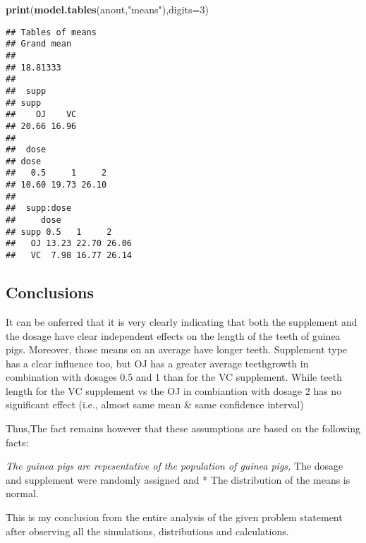 \documentclass[
]{article}
\newenvironment{Shaded}{\begin{snugshade}}{\end{snugshade}}
\newcommand{\DataTypeTok}[1]{\textcolor[rgb]{0.13,0.29,0.53}{#1}}
\newcommand{\DecValTok}[1]{\textcolor[rgb]{0.00,0.00,0.81}{#1}}
\newcommand{\KeywordTok}[1]{\textcolor[rgb]{0.13,0.29,0.53}{\textbf{#1}}}
\newcommand{\NormalTok}[1]{#1}
\newcommand{\StringTok}[1]{\textcolor[rgb]{0.31,0.60,0.02}{#1}}
\begin{document}
\begin{Shaded}
\begin{Highlighting}[]
\KeywordTok{print}\NormalTok{(}\KeywordTok{model.tables}\NormalTok{(anout,}\StringTok{"means"}\NormalTok{),}\DataTypeTok{digits=}\DecValTok{3}\NormalTok{)}
\end{Highlighting}
\end{Shaded}

\begin{verbatim}
## Tables of means
## Grand mean
##          
## 18.81333 
## 
##  supp 
## supp
##    OJ    VC 
## 20.66 16.96 
## 
##  dose 
## dose
##   0.5     1     2 
## 10.60 19.73 26.10 
## 
##  supp:dose 
##     dose
## supp 0.5   1     2    
##   OJ 13.23 22.70 26.06
##   VC  7.98 16.77 26.14
\end{verbatim}

\hypertarget{conclusions}{%
\subsection{Conclusions}\label{conclusions}}

It can be onferred that it is very clearly indicating that both the
supplement and the dosage have clear independent effects on the length
of the teeth of guinea pigs. Moreover, those means on an average have
longer teeth. Supplement type has a clear influence too, but OJ has a
greater average teethgrowth in combination with dosages 0.5 and 1 than
for the VC supplement. While teeth length for the VC supplement vs the
OJ in combiantion with dosage 2 has no significant effect (i.e., almost
same mean \& same confidence interval)

Thus,The fact remains however that these assumptions are based on the
following facts:

\emph{The guinea pigs are repesentative of the population of guinea
pigs, } The dosage and supplement were randomly assigned and * The
distribution of the means is normal.

This is my conclusion from the entire analysis of the given problem
statement after observing all the simulations, distributions and
calculations.
\end{document}
